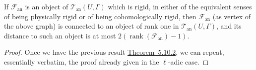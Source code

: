 If \(\mathcal{F}_{\mathrm{an}}\) is an object of
\(\mathcal{T}_{\mathrm{an}}(U,\Gamma)\) which is rigid, in either of the
equivalent senses of being physically rigid or of being cohomologically rigid,
then \(\mathcal{F}_{\mathrm{an}}\) (as vertex of the above graph) is connected
to an object of rank one in \(\mathcal{T}_{\mathrm{an}}(U,\Gamma)\), and its
distance to such an object is at most
\(2(\operatorname{rank}(\mathcal{F}_{\mathrm{an}})-1)\).

\begin{proof}
Once we have the previous result \hyperref[thm:5.10.2]{Theorem~5.10.2}, we
can repeat, essentially verbatim, the proof already given in the
\(\ell\)-adic case.
\end{proof}

